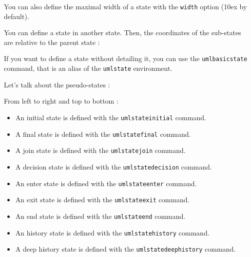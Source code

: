 \documentclass[a4paper,11pt]{report}
\newcommand{\inputTikZ}[1]{%
  }%
\newcommand{\inputTikZ}[1]{%
    \texttt{[image: fig/\#1.pdf]}%
  }%
\begin{document}
\medskip

You can also define the maximal width of a state with the  {\tt width} option (10ex by default).

\medskip

You can define a state in another state. Then, the coordinates of the sub-states are relative to the parent state :

\medskip

\begin{minipage}{0.51\textwidth}

\end{minipage}
\begin{minipage}{0.49\textwidth}
\begin{center}
\inputTikZ{stateinner}
\end{center}
\end{minipage}

\medskip

If you want to define a state without detailing it, you can use the {\tt umlbasicstate} command, that is an alias of the {\tt umlstate} environment.

\medskip

Let's talk about the pseudo-states :

\medskip

\begin{minipage}{0.51\textwidth}

\end{minipage}
\begin{minipage}{0.49\textwidth}
\begin{center}
\inputTikZ{statespecial}
\end{center}
\end{minipage}

\medskip

From left to right and top to bottom :

\medskip

\begin{itemize}
\item An initial state is defined with the {\tt umlstateinitial} command.
\item A final state is defined with the {\tt umlstatefinal} command.
\item A join state is defined with the {\tt umlstatejoin} command.
\item A decision state is defined with the {\tt umlstatedecision} command.
\item An enter state is defined with the {\tt umlstateenter} command.
\item An exit state is defined with the {\tt umlstateexit} command.
\item An end state is defined with the {\tt umlstateend} command.
\item An history state is defined with the {\tt umlstatehistory} command.
\item A deep history state is defined with the {\tt umlstatedeephistory} command.
\end{itemize}
\end{document}
